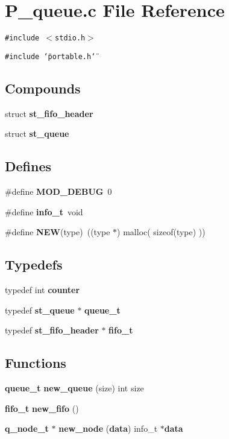\section{P\_\-queue.c File Reference}
\label{P__queue_8c}
{\tt \#include $<$stdio.h$>$}\par
{\tt \#include \char`\"{}portable.h\char`\"{}}\par
\subsection*{Compounds}
\begin{CompactItemize}
\item 
struct {\bf st\_\-fifo\_\-header}
\item 
struct {\bf st\_\-queue}
\end{CompactItemize}
\subsection*{Defines}
\begin{CompactItemize}
\item 
\#define {\bf MOD\_\-DEBUG}\ 0
\item 
\#define {\bf info\_\-t}\ void
\item 
\#define {\bf NEW}(type)\ ((type $\ast$) malloc( sizeof(type) ))
\end{CompactItemize}
\subsection*{Typedefs}
\begin{CompactItemize}
\item 
typedef int {\bf counter}
\item 
typedef {\bf st\_\-queue} $\ast$ {\bf queue\_\-t}
\item 
typedef {\bf st\_\-fifo\_\-header} $\ast$ {\bf fifo\_\-t}
\end{CompactItemize}
\subsection*{Functions}
\begin{CompactItemize}
\item 
{\bf queue\_\-t} {\bf new\_\-queue} (size) int size
\item 
{\bf fifo\_\-t} {\bf new\_\-fifo} ()
\item 
{\bf q\_\-node\_\-t} $\ast$ {\bf new\_\-node} ({\bf data}) info\_\-t $\ast${\bf data}
\end{CompactItemize}
